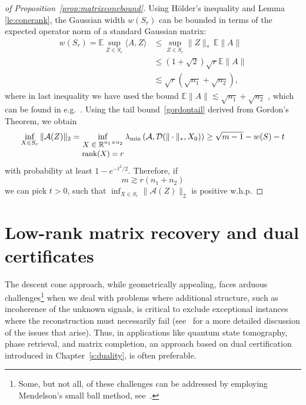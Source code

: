 \begin{proof}[of Proposition~\ref{prop:matrixconebound}]
    Using H\"older's inequality and Lemma \ref{le:conerank}, the Gaussian width $w(S_r)$ can be bounded in terms of the expected operator norm of a standard Gaussian matrix:
\begin{align*}
    w(S_r) = \mathbb{E}\sup_{Z\in S_r} \langle A, Z\rangle & \leq \sup_{Z \in S_r} \|Z \|_* \,\mathbb{E} \|A  \| \\ & \leq\left(1+\sqrt{2}\right)
    \sqrt{r} \mathbb{E}\|A\| \\
    & \lesssim 
    \sqrt{r}(\sqrt{n_1}+\sqrt{n_2}),
\end{align*}
where in last inequality we have used the bound $\mathbb{E}\|A\| \lesssim \sqrt{n_1}+\sqrt{n_2}$ , which can be found in e.g.~\cite[Remark 4.4.4]{vershynin2010introduction}. Using the tail bound~\eqref{gordontail} derived from Gordon's Theorem, we obtain
\begin{align*}
    \inf_{X\in S_r}\|\mathcal{A}(Z)\|_2 = \inf_
    {{\small \begin{matrix}
    X \in \mathbb{R}^{n_1\times n_2} \\ \operatorname{rank}(X)=r
\end{matrix}} }
 \lambda_{\min} \left( \mathcal{A},  \mathcal{D}(\Vert \cdot \Vert_{\ast},X_0)  \right) \ge \sqrt{m-1} - w(S) - t
\end{align*}
 with probability at least $1-e^{-t^2/2}$. Therefore, if
$$
    m \gtrsim r (n_1+n_2) 
$$
we can pick $t>0$, such that $\inf_{X\in S_r}\|\mathcal{A}(Z)\|_2 $ is positive w.h.p. 
\end{proof}





\section{Low-rank matrix recovery and dual certificates}\label{s:matrixdual}


The descent cone approach, while geometrically appealing, faces arduous challenges\footnote{Some, but not all, of these challenges can be addressed by employing Mendelson’s small ball method, see~\cite{mendelson2015learning,koltchinskii2015bounding,tropp2015convex,fuchs2022proof}.}
when we deal with problems where additional structure, such as incoherence of the unknown signals, is critical to exclude exceptional instances where the reconstruction must necessarily fail (see~\cite{fuchs2022proof} for a more detailed discussion  of the issues that arise).
Thus, in applications like quantum state tomography, phase retrieval, and matrix completion, an approach based on dual certification introduced in Chapter~\ref{s:duality}, is often preferable.



